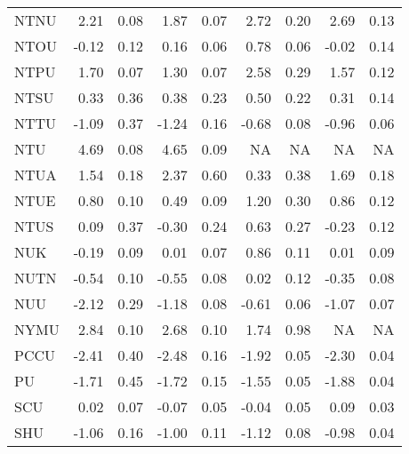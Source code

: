 \begin{longtable}[t]{lrrrrrrrr}
\hspace{1em}NTNU & 2.21 & 0.08 & 1.87 & 0.07 & 2.72 & 0.20 & 2.69 & 0.13\\
\hspace{1em}NTOU & -0.12 & 0.12 & 0.16 & 0.06 & 0.78 & 0.06 & -0.02 & 0.14\\
\hspace{1em}NTPU & 1.70 & 0.07 & 1.30 & 0.07 & 2.58 & 0.29 & 1.57 & 0.12\\
\hspace{1em}NTSU & 0.33 & 0.36 & 0.38 & 0.23 & 0.50 & 0.22 & 0.31 & 0.14\\
\hspace{1em}NTTU & -1.09 & 0.37 & -1.24 & 0.16 & -0.68 & 0.08 & -0.96 & 0.06\\
\hspace{1em}NTU & 4.69 & 0.08 & 4.65 & 0.09 & NA & NA & NA & NA\\
\hspace{1em}NTUA & 1.54 & 0.18 & 2.37 & 0.60 & 0.33 & 0.38 & 1.69 & 0.18\\
\hspace{1em}NTUE & 0.80 & 0.10 & 0.49 & 0.09 & 1.20 & 0.30 & 0.86 & 0.12\\
\hspace{1em}NTUS & 0.09 & 0.37 & -0.30 & 0.24 & 0.63 & 0.27 & -0.23 & 0.12\\
\hspace{1em}NUK & -0.19 & 0.09 & 0.01 & 0.07 & 0.86 & 0.11 & 0.01 & 0.09\\
\hspace{1em}NUTN & -0.54 & 0.10 & -0.55 & 0.08 & 0.02 & 0.12 & -0.35 & 0.08\\
\hspace{1em}NUU & -2.12 & 0.29 & -1.18 & 0.08 & -0.61 & 0.06 & -1.07 & 0.07\\
\hspace{1em}NYMU & 2.84 & 0.10 & 2.68 & 0.10 & 1.74 & 0.98 & NA & NA\\
\hspace{1em}PCCU & -2.41 & 0.40 & -2.48 & 0.16 & -1.92 & 0.05 & -2.30 & 0.04\\
\hspace{1em}PU & -1.71 & 0.45 & -1.72 & 0.15 & -1.55 & 0.05 & -1.88 & 0.04\\
\hspace{1em}SCU & 0.02 & 0.07 & -0.07 & 0.05 & -0.04 & 0.05 & 0.09 & 0.03\\
\hspace{1em}SHU & -1.06 & 0.16 & -1.00 & 0.11 & -1.12 & 0.08 & -0.98 & 0.04\\

\end{longtable}

